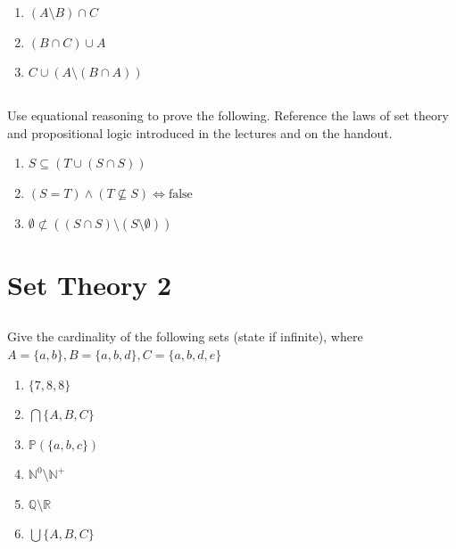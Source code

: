 \documentclass[twocolumn]{article}
\newcommand\mrk[1]{}
\begin{document}
    \begin{enumerate}
        \item $ (A \setminus B) \cap C$ \mrk{1}
        \item $ ( B \cap C ) \cup A $ \mrk{1}
        \item $ C \cup (A \setminus (B \cap A)) $ \mrk{1}
    \end{enumerate}

\subsection{}

Use equational reasoning to prove the following. Reference the laws of set theory and propositional logic introduced in the lectures and on the handout.

\begin{enumerate}
    \item $S \subseteq (T \cup (S \cap S)) $ \mrk{2}
    \item $ (S = T) \wedge (T \not\subseteq S) \Longleftrightarrow \text{false} $ \mrk{2}
    \item $ \emptyset \not\subset ((S \cap S) \setminus (S \setminus \emptyset)) $ \mrk{2}
\end{enumerate}

\clearpage
\setcounter{page}{8}
\setcounter{section}{7}
\section{Set Theory 2}

\subsection{}

    Give the cardinality of the following sets (state if infinite), where $ A = \{ a, b \}, B = \{ a, b, d\}, C = \{a, b, d, e \}$

    \begin{multicols}{2}
    \begin{enumerate}
        \item $\{ 7, 8, 8\}$ \mrk{1}
        \item $\bigcap \{ A, B, C \} $ \mrk{1}
        \item $\mathbb{P}(\{ a, b, c\})$ \mrk{1}
        \item $\mathbb{N}^0 \setminus \mathbb{N}^+$ \mrk{1}
        \item $\mathbb{Q} \setminus \mathbb{R}$ \mrk{1}
        \item $\bigcup \{ A, B, C \} $ \mrk{1}
    \end{enumerate}
\end{multicols}
\end{document}
